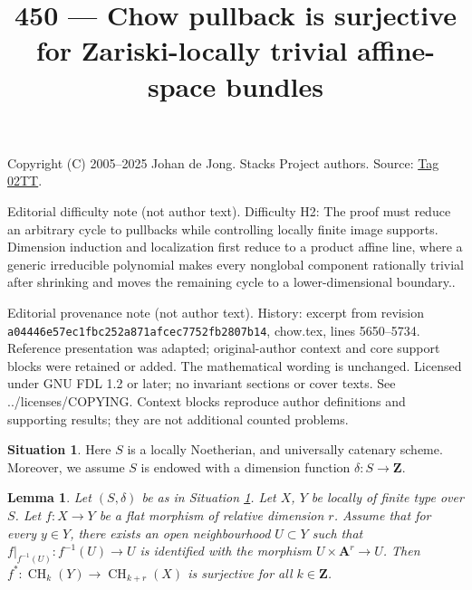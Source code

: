 \documentclass{amsart}
\theoremstyle{plain}
\newtheorem{lemma}[subsection]{Lemma}
\theoremstyle{definition}
\newtheorem{situation}[subsection]{Situation}
\theoremstyle{remark}
\numberwithin{equation}{subsection}
\def\CH{\mathop{\mathrm{CH}}\nolimits}
\begin{document}
\title[Stacks Project, Tag 02TT]{450 --- Chow pullback is surjective for Zariski-locally trivial affine-space bundles}
\maketitle
\noindent Copyright (C) 2005--2025 Johan de Jong. Stacks Project authors. Source: \href{https://stacks.math.columbia.edu/tag/02TT}{Tag 02TT}.

\noindent Editorial difficulty note (not author text). Difficulty H2: The proof must reduce an arbitrary cycle to pullbacks while controlling locally finite image supports. Dimension induction and localization first reduce to a product affine line, where a generic irreducible polynomial makes every nonglobal component rationally trivial after shrinking and moves the remaining cycle to a lower-dimensional boundary..

\noindent Editorial provenance note (not author text). History: excerpt from revision \texttt{a0444\allowbreak 6e57e\allowbreak c1fbc\allowbreak 252a8\allowbreak 71afc\allowbreak ec775\allowbreak 2fb28\allowbreak 07b14}, chow.tex, lines 5650--5734. Reference presentation was adapted; original-author context and core support blocks were retained or added. The mathematical wording is unchanged. Licensed under GNU FDL 1.2 or later; no invariant sections or cover texts. See ../licenses/COPYING. Context blocks reproduce author definitions and supporting results; they are not additional counted problems.

\begin{situation}
\label{situation-setup}
Here $S$ is a locally Noetherian, and universally catenary scheme.
Moreover, we assume $S$ is endowed with a dimension function
$\delta : S \longrightarrow \mathbf{Z}$.
\end{situation}

\begin{lemma}
\label{lemma-pullback-affine-fibres-surjective}
Let $(S, \delta)$ be as in Situation \ref{situation-setup}.
Let $X$, $Y$ be locally of finite type over $S$.
Let $f : X \to Y$ be a flat morphism of relative dimension $r$.
Assume that for every $y \in Y$, there exists an open neighbourhood
$U \subset Y$ such that $f|_{f^{-1}(U)} : f^{-1}(U) \to U$
is identified with the morphism $U \times \mathbf{A}^r \to U$.
Then $f^* : \CH_k(Y) \to \CH_{k + r}(X)$ is surjective for all
$k \in \mathbf{Z}$.
\end{lemma}
\end{document}
